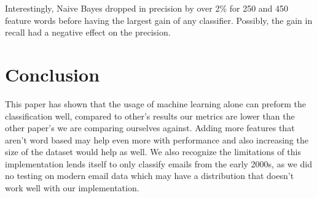 \documentclass[12pt]{article}
\begin{document}
\begin{multicols}{2}
                Interestingly, Naive Bayes dropped in precision by over 2\% 
                for 250 and 450 feature words before having the largest gain of any classifier. 
                Possibly, the gain in recall had a negative effect on the precision.
                

        \section{Conclusion}
        
            This paper has shown that the usage of machine learning alone can preform
            the classification well, compared to other's results our metrics are lower
            than the other paper's we are comparing ourselves against. Adding more features
            that aren't word based may help even more with performance and also increasing the
            size of the dataset would help as well. We also recognize the limitations of
            this implementation lends itself to only classify emails from the early 2000s, as
            we did no testing on modern email data which may have a distribution that doesn't
            work well with our implementation.
        \nocite{*}
         
        
    \end{multicols}
\end{document}
